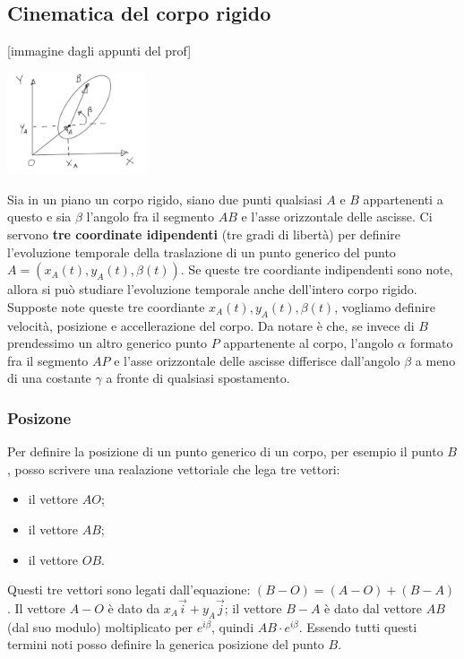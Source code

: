 \subsection{Cinematica del corpo rigido}
[immagine dagli appunti del prof]
\begin{center}
    \includegraphics[height=3cm]{../lezione2/img11.JPG}
\end{center}
Sia in un piano un corpo rigido, siano due punti qualsiasi $A$ e $B$ appartenenti a questo e sia $\beta$ l'angolo fra il segmento $AB$ e l'asse orizzontale delle ascisse.\newline
\newline
Ci servono \textbf{tre coordinate idipendenti} (tre gradi di libertà) per definire l'evoluzione temporale della traslazione di un punto generico del punto $A = (x_A(t), y_A(t), \beta(t))$. Se queste tre coordiante indipendenti sono note, allora si può studiare l'evoluzione temporale anche dell'intero corpo rigido.\newline
\newline
Supposte note queste tre coordiante $x_A(t), y_A(t), \beta(t)$, vogliamo definire velocità, posizione e accellerazione del corpo.\newline
\newline
Da notare è che, se invece di $B$ prendessimo un altro generico punto $P$ appartenente al corpo, l'angolo $\alpha$ formato fra il segmento $AP$ e l'asse orizzontale delle ascisse differisce dall'angolo $\beta$ a meno di una costante $\gamma$ a fronte di qualsiasi spostamento.
\subsubsection{Posizone}
Per definire la posizione di un punto generico di un corpo, per esempio il punto $B$, posso scrivere una realazione vettoriale che lega tre vettori:
\begin{itemize}
    \item il vettore $AO$;
    \item il vettore $AB$;
    \item il vettore $OB$.
\end{itemize}
Questi tre vettori sono legati dall'equazione: $(B-O) = (A-O) + (B-A)$. Il vettore $A-O$ è dato da $x_A \vec{i} + y_A \vec{j}$; il vettore $B-A$ è dato dal vettore $AB$ (dal suo modulo) moltiplicato per $e^{i \beta}$, quindi $AB \cdot e^{i \beta}$. Essendo tutti questi termini noti posso definire la generica posizione del punto $B$.
